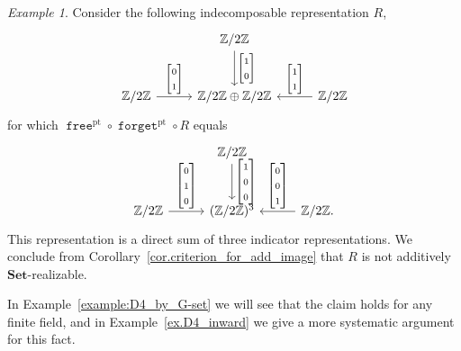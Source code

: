 \documentclass[a4paper]{amsart}
\theoremstyle{plain}
\theoremstyle{definition}
\theoremstyle{remark}
\newtheorem{example}[theorem]{Example}
\newcommand{\funct}[1]{\operatorname{\mathtt{#1}}}
\newcommand{\Set}{\mathbf{Set}}
\newcommand{\Z}{\mathbb{Z}}
\begin{document}
\begin{example}\label{ex.D4}
Consider the following indecomposable representation $R$,
\[ \begin{tikzcd}[sep=10mm]
& \Z/2\Z \ar{d}{\begin{bmatrix} 1 \\ 0 \end{bmatrix}} & \\
\Z/2\Z  \ar{r}{\begin{bmatrix} 0 \\ 1 \end{bmatrix}} & \Z/2\Z\oplus \Z/2\Z  & \Z/2\Z  \ar{l}[swap]{\begin{bmatrix} 1 \\ 1 \end{bmatrix}} 
\end{tikzcd} \]
for which $\funct{free}^\mathrm{pt} \circ \funct{forget}^\mathrm{pt} \circ R$ equals
\[ \begin{tikzcd}[sep=10mm]
& \Z/2\Z \ar{d}{\begin{bmatrix} 1 \\ 0 \\ 0 \end{bmatrix}} & \\
\Z/2\Z  \ar{r}{\begin{bmatrix} 0 \\ 1 \\ 0 \end{bmatrix}} & (\Z/2\Z)^3  & \Z/2\Z \ar{l}[swap]{\begin{bmatrix} 0 \\ 0 \\ 1 \end{bmatrix}}.
\end{tikzcd} \]
This representation is a direct sum of three indicator representations. We conclude from Corollary~\ref{cor.criterion_for_add_image} that $R$ is not additively $\Set$-realizable. 
\end{example}

In Example~\ref{example:D4_by_G-set} we will see that the claim holds for any finite field, and in Example~\ref{ex.D4_inward} we give a more systematic argument for this fact.
\end{document}
